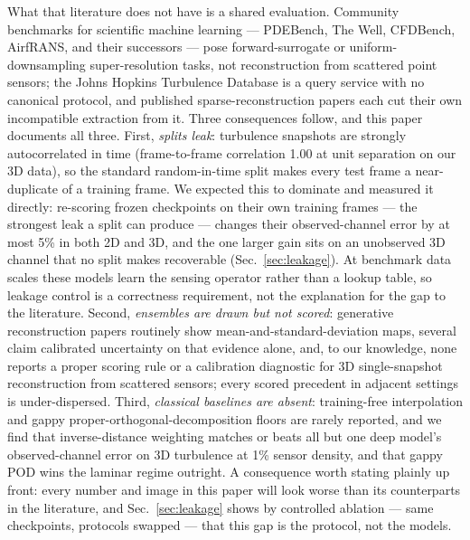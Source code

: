 \documentclass[aip,pof,reprint,amsmath,amssymb,superscriptaddress]{revtex4-1}
\begin{document}
What that literature does not have is a shared evaluation. Community benchmarks
for scientific machine learning --- PDEBench,\cite{takamoto2022pdebench} The
Well,\cite{ohana2024well} CFDBench,\cite{luo2023cfdbench}
AirfRANS,\cite{bonnet2022airfrans} and their successors --- pose
forward-surrogate or uniform-downsampling
super-resolution tasks, not reconstruction from scattered point sensors; the
Johns Hopkins Turbulence Database is a query service with no canonical protocol,
and published sparse-reconstruction papers each cut their own incompatible
extraction from it. Three consequences follow, and this paper documents all
three. First, \emph{splits leak}: turbulence snapshots are strongly
autocorrelated in time (frame-to-frame correlation 1.00 at unit separation on
our 3D data), so the standard random-in-time split makes every test frame a
near-duplicate of a training frame. We expected this to dominate and measured
it directly: re-scoring frozen checkpoints on their own training frames ---
the strongest leak a split can produce --- changes their observed-channel
error by at most 5\% in both 2D and 3D, and the one larger gain sits on an
unobserved 3D channel that no split makes recoverable
(Sec.~\ref{sec:leakage}). At benchmark data scales these models learn the
sensing operator rather than a lookup table, so
leakage control is a correctness requirement, not the explanation for the gap
to the literature. Second, \emph{ensembles are drawn but not scored}:
generative reconstruction papers routinely show mean-and-standard-deviation
maps, several claim calibrated uncertainty on that evidence alone, and, to our
knowledge, none reports a proper scoring rule or a calibration diagnostic for
3D single-snapshot reconstruction from scattered
sensors;\cite{gneiting2007strictly,rybchuk2023ensemble,manshausen2025generative,giral2026genda,gao2026uqshred}
every scored precedent in adjacent settings is under-dispersed. Third,
\emph{classical baselines are absent}: training-free interpolation and gappy
proper-orthogonal-decomposition floors are rarely reported, and we find that
inverse-distance weighting matches or beats all but one deep model's
observed-channel error on 3D turbulence at 1\% sensor density, and that gappy
POD wins the laminar regime outright. A consequence worth stating
plainly up front: every number and image in this paper will look worse than
its counterparts in the literature, and Sec.~\ref{sec:leakage} shows by
controlled ablation --- same checkpoints, protocols swapped --- that this
gap is the protocol, not the models.
\end{document}

